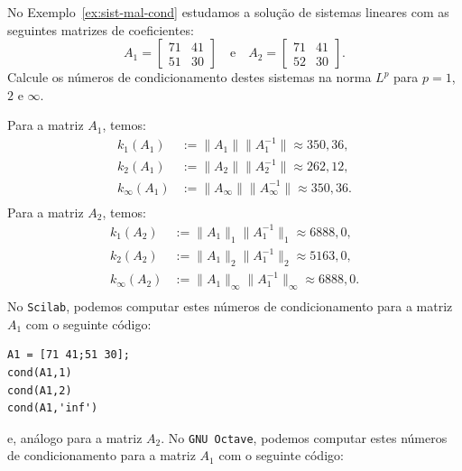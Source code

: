 \begin{ex}
  No Exemplo~\ref{ex:sist-mal-cond} estudamos a solução de sistemas lineares com as seguintes matrizes de coeficientes:
  \begin{equation}
    A_1 =
    \begin{bmatrix}
      71 & 41\\
      51 & 30
    \end{bmatrix}\quad\text{e}\quad
    A_2 =
    \begin{bmatrix}
      71 & 41\\
      52 & 30
    \end{bmatrix}.
  \end{equation}
Calcule os números de condicionamento destes sistemas na norma $L^p$ para $p=1$, $2$ e $\infty$.
\end{ex}
\begin{sol}
  Para a matriz $A_1$, temos:
  \begin{equation}
    \begin{split}
      k_1(A_1) &:= \|A_1\|\|A_1^{-1}\| \approx 350,36,\\
      k_2(A_1) &:= \|A_2\|\|A_2^{-1}\| \approx 262,12,\\
      k_\infty(A_1) &:= \|A_\infty\|\|A_\infty^{-1}\| \approx 350,36.\\
    \end{split}
  \end{equation}
  Para a matriz $A_2$, temos:
  \begin{equation}
    \begin{split}
      k_1(A_2) &:= \|A_1\|_1\|A_1^{-1}\|_1 \approx 6888,0,\\
      k_2(A_2) &:= \|A_1\|_2\|A_1^{-1}\|_2 \approx 5163,0,\\
      k_\infty(A_2) &:= \|A_1\|_\infty\|A_1^{-1}\|_\infty \approx 6888,0.\\
    \end{split}
  \end{equation}
\ifisscilab
No \verb+Scilab+, podemos computar estes números de condicionamento para a matriz $A_1$ com o seguinte código:
\begin{verbatim}
A1 = [71 41;51 30];
cond(A1,1)
cond(A1,2)
cond(A1,'inf')
\end{verbatim}
e, análogo para a matriz $A_2$.
\fi
\ifisoctave
No \verb+GNU Octave+, podemos computar estes números de condicionamento para a matriz $A_1$ com o seguinte código:

\end{sol}
